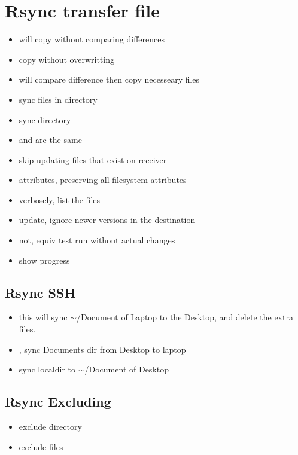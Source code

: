 \section{Rsync transfer file}
\begin{itemize}
\item {} will copy without comparing differences
\item {} copy without overwritting
\item {} will compare difference then copy necesseary files
\item {} sync files in directory
\item {} sync directory
\item {} and  are the same
\item {} skip updating files that exist on receiver
\item {} attributes, preserving all filesystem attributes
\item {} verbosely, list the files
\item {} update, ignore newer versions in the destination
\item {} not, equiv  test run without actual changes
\item {} show progress
\end{itemize}

\subsection{Rsync SSH}
\begin{itemize}
\item{} this will sync  $\sim$/Document of Laptop to the Desktop, and delete the extra files.\\
\item{}, sync Documents dir from Desktop to laptop\\
\item{} sync localdir to $\sim$/Document of Desktop
\end{itemize}

\subsection{Rsync Excluding}
\begin{itemize}
\item{} exclude directory\\
\item{} exclude files
\end{itemize}

